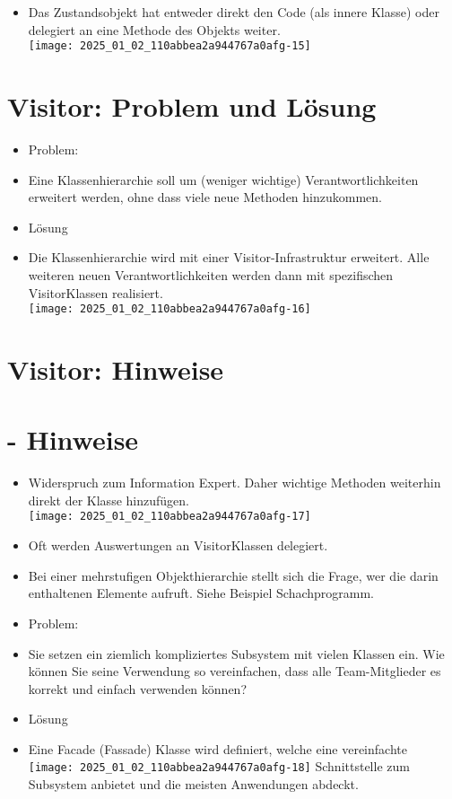 \documentclass[10pt]{article}
\begin{document}
\begin{itemize}
  \item Das Zustandsobjekt hat entweder direkt den Code (als innere Klasse) oder delegiert an eine Methode des Objekts weiter.\\
\texttt{[image: 2025\_01\_02\_110abbea2a944767a0afg-15]}
\end{itemize}

\section*{Visitor: Problem und Lösung}
\begin{itemize}
  \item Problem:
  \item Eine Klassenhierarchie soll um (weniger wichtige) Verantwortlichkeiten erweitert werden, ohne dass viele neue Methoden hinzukommen.
  \item Lösung
  \item Die Klassenhierarchie wird mit einer Visitor-Infrastruktur erweitert. Alle weiteren neuen Verantwortlichkeiten werden dann mit spezifischen VisitorKlassen realisiert.\\
\texttt{[image: 2025\_01\_02\_110abbea2a944767a0afg-16]}
\end{itemize}

\section*{Visitor: Hinweise}
\section*{- Hinweise}
\begin{itemize}
  \item Widerspruch zum Information Expert. Daher wichtige Methoden weiterhin direkt der Klasse hinzufügen.\\
\texttt{[image: 2025\_01\_02\_110abbea2a944767a0afg-17]}
  \item Oft werden Auswertungen an VisitorKlassen delegiert.
  \item Bei einer mehrstufigen Objekthierarchie stellt sich die Frage, wer die darin enthaltenen Elemente aufruft. Siehe Beispiel Schachprogramm.
  \item Problem:
  \item Sie setzen ein ziemlich kompliziertes Subsystem mit vielen Klassen ein. Wie können Sie seine Verwendung so vereinfachen, dass alle Team-Mitglieder es korrekt und einfach verwenden können?
  \item Lösung
  \item Eine Facade (Fassade) Klasse wird definiert, welche eine vereinfachte\\
\texttt{[image: 2025\_01\_02\_110abbea2a944767a0afg-18]} Schnittstelle zum Subsystem anbietet und die meisten Anwendungen abdeckt.
\end{itemize}
\end{document}
